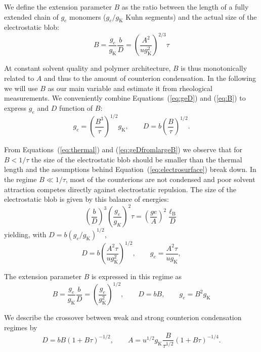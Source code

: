 \documentclass[journal=jacsat,manuscript=article]{achemso}
\begin{document}
We define the extension parameter $B$ as the ratio between the length of a fully extended chain of $g_e$ monomers ($g_e/g_\mathrm{K}$ Kuhn segments) and the actual size of the electrostatic blob: 
\begin{equation}
B = \frac{g_e}{g_\mathrm{K}}\frac{b}{D} = \left(\frac{A^2}{u g_\mathrm{K}^2}\right)^{2/3} \tau
\label{eq:B}
\end{equation}

At constant solvent quality and polymer architecture, $B$ is thus monotonically related to $A$ and thus to the amount of counterion condensation. In the following we will use $B$ as our main variable and estimate it from rheological measurements. We conveniently combine Equations~(\ref{eq:geD}) and (\ref{eq:B}) to express $g_e$ and $D$ function of $B$:
\begin{equation}
g_e = \left(\frac{B^3}{\tau}\right)^{1/2} g_\mathrm{K},\qquad D = b \left(\frac{B}{\tau}\right)^{1/2}.
\label{eq:geDfromlargeB}
\end{equation}

From Equations~(\ref{eq:thermal}) and (\ref{eq:geDfromlargeB}) we observe that for $B<1/\tau$ the size of the electrostatic blob should be smaller than the thermal length and the assumptions behind Equation~(\ref{eq:electrosurface}) break down. In the regime $B\ll 1/\tau$, most of the counterions are not condensed and poor solvent attraction competes directly against electrostatic repulsion. The size of the electrostatic blob is given by this balance of energies:
\begin{equation}
\left(\frac{b}{D}\right)^3\left(\frac{g_e}{g_K}\right)^2 \tau = \left(\frac{ge}{A}\right)^2 \frac{\ell_\mathrm{B}}{D}
\label{eq:poorelec}
\end{equation}
yielding, with $D = b(g_e/g_\mathrm{K})^{1/2}$,
\begin{equation}
D = b \left(\frac{A^2\tau}{u g_\mathrm{K}^2}\right)^{1/2}, \qquad g_e = \frac{A^2\tau}{u g_\mathrm{K}},
\end{equation}

The extension parameter $B$ is expressed in this regime as
\begin{equation}
B = \frac{g_e}{g_\mathrm{K}}\frac{b}{D} = \left(\frac{g_e}{g_\mathrm{K}^2}\right)^{1/2}, \qquad D = bB, \qquad g_e = B^2 g_\mathrm{K}
\label{eq:geDfromsmallB}
\end{equation}

We describe the crossover between weak and strong counterion condensation regimes by
\begin{equation}
D = bB (1+B\tau)^{-1/2}, \qquad
A = u^{1/2} g_\mathrm{K} \frac{B}{\tau^{1/2}}(1+B\tau)^{-1/4}.
\label{eq:geDfromB}
\end{equation}
\end{document}
